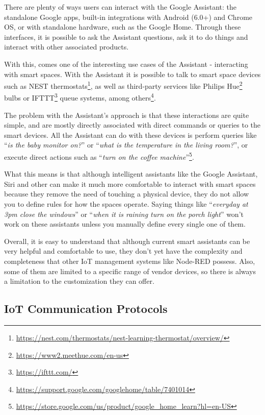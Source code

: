 \documentclass[runningheads]{llncs}
\begin{document}
There are plenty of ways users can interact with the Google Assistant: the standalone Google apps, built-in integrations with Android (6.0+) and Chrome OS, or with standalone hardware, such as the Google Home. Through these interfaces, it is possible to ask the Assistant questions, ask it to do things and interact with other associated products.

With this, comes one of the interesting use cases of the Assistant - interacting with smart spaces. With the Assistant it is possible to talk to smart space devices such as NEST thermostats\footnote{\url{https://nest.com/thermostats/nest-learning-thermostat/overview/}}, as well as third-party services like Philips Hue\footnote{\url{https://www2.meethue.com/en-us}} bulbs or IFTTT\footnote{\url{https://ifttt.com/}} queue systems, among others\footnote{\url{https://support.google.com/googlehome/table/7401014}}.

The problem with the Assistant’s approach is that these interactions are quite simple, and are mostly directly associated with direct commands or queries to the smart devices. All the Assistant can do with these devices is perform queries like “\textit{is the baby monitor on?}” or “\textit{what is the temperature in the living room?}”, or execute direct actions such as “\textit{turn on the coffee machine}”\footnote{\url{https://store.google.com/us/product/google\_home\_learn?hl=en-US}}.

What this means is that although intelligent assistants like the Google Assistant, Siri and other can make it much more comfortable to interact with smart spaces because they remove the need of touching a physical device, they do not allow you to define rules for how the spaces operate. Saying things like “\textit{everyday at 3pm close the windows}” or  “\textit{when it is raining turn on the porch light}” won’t work on these assistants unless you manually define every single one of them.

Overall, it is easy to understand that although current smart assistants can be very helpful and comfortable to use, they don’t yet have the complexity and completeness that other IoT management systems like Node-RED possess. Also, some of them are limited to a specific range of vendor devices, so there is always a limitation to the customization they can offer.

\subsection{IoT Communication Protocols}
\end{document}
